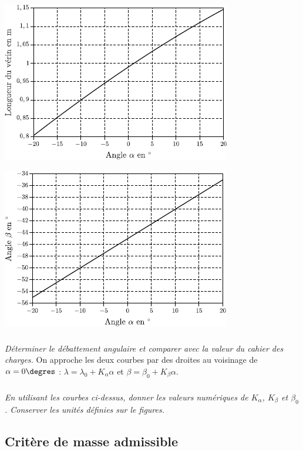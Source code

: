 \documentclass[10pt,fleqn]{article} %
\begin{document}
\begin{multicols}{2}
\begin{center}
\includegraphics[width=.95\linewidth]{images/fig_04_a}
\end{center}

\begin{center}
\includegraphics[width=.95\linewidth]{images/fig_04_b}
\end{center}

\subparagraph{}\textit{Déterminer le débattement angulaire et comparer avec la valeur du cahier des charges.}
On approche les deux courbes par des droites au voisinage de $\alpha = 0\degres$ : $\lambda = \lambda_0 + K_{\alpha} \alpha$ et
$\beta= \beta_0 + K_{\beta} \alpha$.
\subparagraph{}\textit{En utilisant les courbes ci-dessus, 
donner les valeurs numériques de $K_{\alpha}$, $K_{\beta}$ et $\beta_0$.
Conserver les unités définies sur le figures.}


\subsection*{Critère de masse admissible}


\end{multicols}
\end{document}
